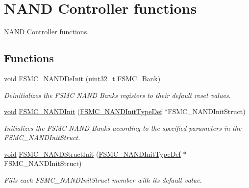 \hypertarget{group___f_s_m_c___group2}{\section{N\-A\-N\-D Controller functions}
\label{group___f_s_m_c___group2}
}


N\-A\-N\-D Controller functions.  


\subsection*{Functions}
\begin{DoxyCompactItemize}
\item 
\hyperlink{group___n_a_m_e_ga18028b8badbf1ea7e704ccac3c488e82}{void} \hyperlink{group___f_s_m_c___group2_gafb749503293474a68555961bd8f120e1}{F\-S\-M\-C\-\_\-\-N\-A\-N\-D\-De\-Init} (\hyperlink{stdint_8h_a435d1572bf3f880d55459d9805097f62}{uint32\-\_\-t} F\-S\-M\-C\-\_\-\-Bank)
\begin{DoxyCompactList}\small\item\em Deinitializes the F\-S\-M\-C N\-A\-N\-D Banks registers to their default reset values. \end{DoxyCompactList}\item 
\hyperlink{group___n_a_m_e_ga18028b8badbf1ea7e704ccac3c488e82}{void} \hyperlink{group___f_s_m_c___group2_ga9f81ccc4e126c11f1eb33077b1a68e6f}{F\-S\-M\-C\-\_\-\-N\-A\-N\-D\-Init} (\hyperlink{struct_f_s_m_c___n_a_n_d_init_type_def}{F\-S\-M\-C\-\_\-\-N\-A\-N\-D\-Init\-Type\-Def} $\ast$F\-S\-M\-C\-\_\-\-N\-A\-N\-D\-Init\-Struct)
\begin{DoxyCompactList}\small\item\em Initializes the F\-S\-M\-C N\-A\-N\-D Banks according to the specified parameters in the F\-S\-M\-C\-\_\-\-N\-A\-N\-D\-Init\-Struct. \end{DoxyCompactList}\item 
\hyperlink{group___n_a_m_e_ga18028b8badbf1ea7e704ccac3c488e82}{void} \hyperlink{group___f_s_m_c___group2_ga8283ad94ad8e83d49d5b77d1c7e17862}{F\-S\-M\-C\-\_\-\-N\-A\-N\-D\-Struct\-Init} (\hyperlink{struct_f_s_m_c___n_a_n_d_init_type_def}{F\-S\-M\-C\-\_\-\-N\-A\-N\-D\-Init\-Type\-Def} $\ast$F\-S\-M\-C\-\_\-\-N\-A\-N\-D\-Init\-Struct)
\begin{DoxyCompactList}\small\item\em Fills each F\-S\-M\-C\-\_\-\-N\-A\-N\-D\-Init\-Struct member with its default value. \end{DoxyCompactList}\item 

\end{DoxyCompactItemize}

